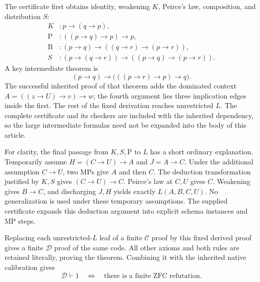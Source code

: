 The certificate first obtains identity, weakening $K$, Peirce's law,
composition, and distribution $S$:
\begin{align*}
 K&:p\to(q\to p),\\
 \mathrm P&:((p\to q)\to p)\to p,\\
 \mathrm B&:(p\to q)\to((q\to r)\to(p\to r)),\\
 S&:(p\to(q\to r))\to((p\to q)\to(p\to r)).
\end{align*}
A key intermediate theorem is
\[
 (p\to q)\to\bigl(((p\to r)\to p)\to q\bigr).
\]
The successful inherited proof of that theorem adds the dominated
context $A=((z\to U)\to v)\to w$; the fourth argument lies three
implication edges inside the first.  The rest of the fixed derivation
reaches unrestricted $L$.  The complete certificate and its checkers
are included with the inherited dependency, so the large intermediate
formulas need not be expanded into the body of this article.

For clarity, the final passage from $K,S,\mathrm P$ to $L$ has a short
ordinary explanation.  Temporarily assume
$H=(C\to U)\to A$ and $J=A\to C$.  Under the additional assumption
$C\to U$, two MPs give $A$ and then $C$.  The deduction transformation
justified by $K,S$ gives $(C\to U)\to C$.  Peirce's law at $C,U$
gives $C$.  Weakening gives $B\to C$, and discharging $J,H$ yields
exactly $L(A,B,C,U)$.  No generalization is used under these temporary
assumptions.  The supplied certificate expands this deduction argument
into explicit schema instances and MP steps.

Replacing each unrestricted-$L$ leaf of a finite $\mathcal C$ proof by
this fixed derived proof gives a finite $\mathcal D$ proof of the same
code.  All other axioms and both rules are retained literally, proving
the theorem.  Combining it with the inherited native calibration gives
\[
       \mathcal D\vdash1
       \quad\Longleftrightarrow\quad
       \text{there is a finite ZFC refutation}.       \tag{C1}
\]

